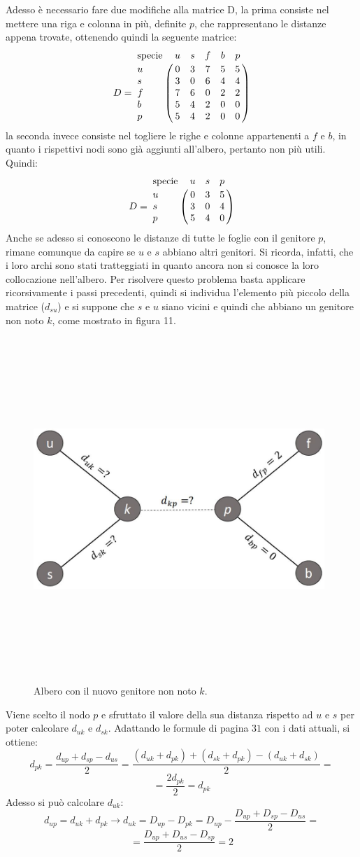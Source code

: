 Adesso è necessario fare due modifiche alla matrice D, la prima consiste nel mettere una riga e colonna in più, definite $p$, che rappresentano le distanze appena trovate, ottenendo quindi la seguente matrice:
\[
D = \bordermatrix{\text{specie}&u&s&f&b&p\cr
                u& 0 & 3 & 7 & 5 & 5\cr
                s& 3 & 0 & 6 & 4 & 4\cr
                f& 7 & 6 & 0 & 2 & 2\cr
                b& 5 & 4 & 2 & 0 & 0\cr
                p&  5 & 4 & 2 & 0 & 0}
\]
la seconda invece consiste nel togliere le righe e colonne appartenenti a $f$ e $b$, in quanto i rispettivi nodi sono già aggiunti all'albero, pertanto non più utili. Quindi:
\[
D = \bordermatrix{\text{specie}&u&s&p\cr
                u& 0 & 3 & 5\cr
                s& 3 & 0 & 4\cr
                p&  5 & 4 & 0}
\]
Anche se adesso si conoscono le distanze di tutte le foglie con il genitore $p$, rimane comunque da capire se $u$ e $s$ abbiano altri genitori. Si ricorda, infatti, che i loro archi sono stati tratteggiati in quanto ancora non si conosce la loro collocazione nell'albero.
Per risolvere questo problema basta applicare ricorsivamente i passi precedenti, quindi si individua l'elemento più piccolo della matrice ($d_{su}$) e si suppone che $s$ e $u$ siano vicini e quindi che abbiano un genitore non noto $k$, come mostrato in figura 11.
\newpage
\begin{figure}[h!]
\centering
	\includegraphics[height=13cm, width=11cm, keepaspectratio]{distance_between_s_u.jpg}
 	\caption{Albero con il nuovo genitore non noto $k$.}
  	\label{fig:neighborsleaves_3}
\end{figure}
Viene scelto il nodo $p$ e sfruttato il valore della sua distanza rispetto ad $u$ e $s$ per poter calcolare $d_{uk}$ e $d_{sk}$. Adattando le formule di pagina $31$ con i dati attuali, si ottiene:
\[d_{pk}=\frac{d_{up}+d_{sp}-d_{us}}2=
\frac{(d_{uk}+d_{pk})+(d_{sk}+d_{pk})-(d_{uk}+d_{sk})}2=\]
\[=\frac{2d_{pk}}2=d_{pk}
\]
Adesso si può calcolare $d_{uk}$:
\[d_{up}=d_{uk}+d_{pk} \rightarrow d_{uk}=D_{up}-D_{pk}=D_{up}-\frac{D_{up}+D_{sp}-D_{us}}2=\]
\[=\frac{D_{up}+D_{us}-D_{sp}}2=2\]


